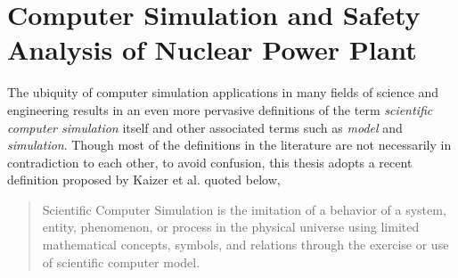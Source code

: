 \section{Computer Simulation and Safety Analysis of Nuclear Power Plant}\label{sec:intro_computer_simulation}

The ubiquity of computer simulation applications in many fields of science and engineering results in an even more pervasive definitions of the term \textit{scientific computer simulation} itself 
and other associated terms such as \textit{model} and \textit{simulation}.
Though most of the definitions in the literature are not necessarily in contradiction to each other, 
to avoid confusion, this thesis adopts a recent definition proposed by Kaizer et al.\cite{Kaizer2015} quoted below,

\begin{quote}
	Scientific Computer Simulation is the imitation of a behavior of a system, entity, phenomenon, or process in the physical universe using limited mathematical concepts, symbols, and relations through the exercise or use of scientific computer model.
\end{quote}